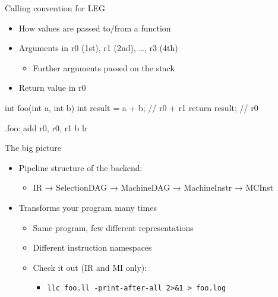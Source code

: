 
\begin{frame}[fragile]{Calling convention for LEG}

\begin{itemize}
    \item How values are passed to/from a function
    \item Arguments in r0 (1st), r1 (2nd), …, r3 (4th)
    \begin{itemize}
        \item Further arguments passed on the stack
    \end{itemize}
    \item Return value in r0
\end{itemize}

\begin{codebox}
int foo(int a, int b) {
    int result = a + b;   // r0 + r1
    return result;        // r0
}
\end{codebox}

\begin{codebox}
.foo:
    add r0, r0, r1
    b lr
\end{codebox}

\end{frame}


\begin{frame}{The big picture}

\begin{itemize}
    \item Pipeline structure of the backend:
    \begin{itemize}
        \item IR → SelectionDAG → MachineDAG  → MachineInstr → MCInst
    \end{itemize}
    \item Transforms your program many times
    \begin{itemize}
        \item Same program, few different representations
        \item Different instruction namespaces
        \item Check it out (IR and MI only):
        \begin{itemize}
            \item \texttt{llc foo.ll -print-after-all 2>\&1 > foo.log}
        \end{itemize}
    \end{itemize}
\end{itemize}

\end{frame}

